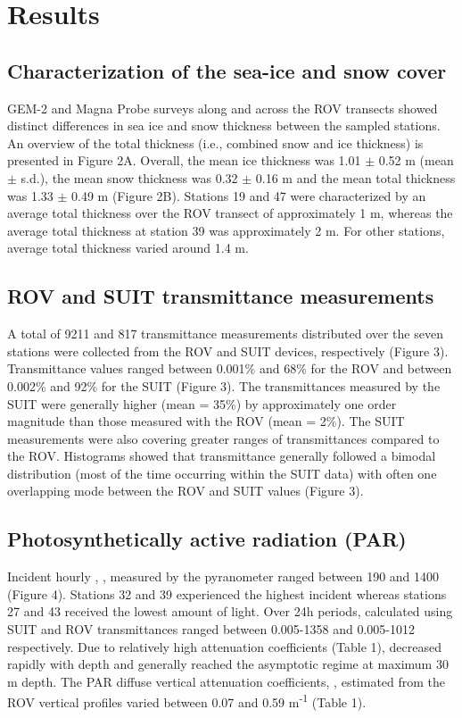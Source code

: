 \section{Results}

\subsection{Characterization of the sea-ice and snow cover}

GEM-2 and Magna Probe surveys along and across the ROV transects showed distinct differences in sea ice and snow thickness between the sampled stations. An overview of the total thickness (i.e., combined snow and ice thickness) is presented in Figure 2A. Overall, the mean ice thickness was 1.01 $\pm$ 0.52 m (mean $\pm$ s.d.), the mean snow thickness was 0.32 $\pm$ 0.16 m and the mean total thickness was 1.33 $\pm$ 0.49 m (Figure 2B). Stations 19 and 47 were characterized by an average total thickness over the ROV transect of approximately 1 m, whereas the average total thickness at station 39 was approximately 2 m. For other stations, average total thickness varied around 1.4 m.

\subsection{ROV and SUIT transmittance measurements}

A total of 9211 and 817 transmittance measurements distributed over the seven stations were collected from the ROV and SUIT devices, respectively (Figure 3). Transmittance values ranged between 0.001\% and 68\% for the ROV and between 0.002\% and 92\% for the SUIT (Figure 3). The transmittances measured by the SUIT were generally higher (mean = 35\%) by approximately one order magnitude than those measured with the ROV (mean = 2\%). The SUIT measurements were also covering greater ranges of transmittances compared to the ROV. Histograms showed that transmittance generally followed a bimodal distribution (most of the time occurring within the SUIT data) with often one overlapping mode between the ROV and SUIT values (Figure 3). 

\subsection{Photosynthetically active radiation (PAR)}

Incident hourly \eparscalar{}, \eparzeroscalar{}, measured by the pyranometer ranged between 190 and 1400 \micromol{} (Figure 4). Stations 32 and 39 experienced the highest incident \eparzeroscalar{} whereas stations 27 and 43 received the lowest amount of light. Over 24h periods, \eparzintscalar{} calculated using SUIT and ROV transmittances ranged between 0.005-1358 and 0.005-1012 \micromol{} respectively. Due to relatively high attenuation coefficients (Table 1), \eparscalar{} decreased rapidly with depth and generally reached the asymptotic regime at maximum 30 m depth. The PAR diffuse vertical attenuation coefficients, \kdparscalar{}, estimated from the ROV vertical profiles varied between 0.07 and 0.59 m\textsuperscript{-1} (Table 1).

